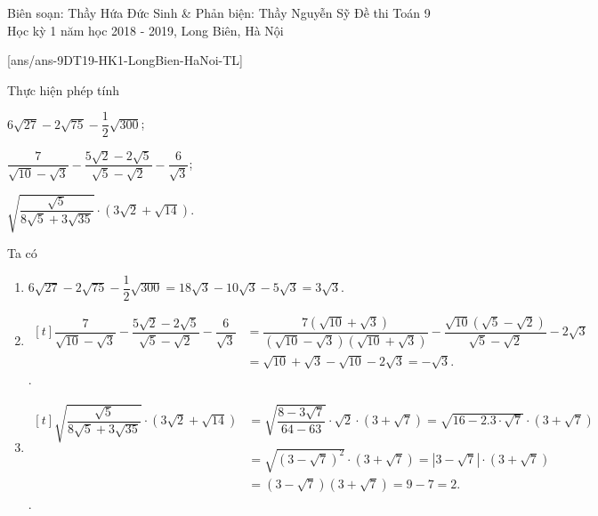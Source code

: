 \begin{name}
{Biên soạn: Thầy Hứa Đức Sinh \& Phản biện: Thầy Nguyễn Sỹ}
{Đề thi Toán 9 Học kỳ 1 năm học 2018 - 2019, Long Biên, Hà Nội}
\end{name}
\setcounter{bt}{0}
[ans/ans-9DT19-HK1-LongBien-HaNoi-TL]
\begin{ex}%
	Thực hiện phép tính
	\begin{listEX}[2]
		\item $6\sqrt{27} - 2\sqrt{75} - \dfrac{1}{2}\sqrt{300}$;
		\item $\dfrac{7}{\sqrt{10} - \sqrt{3}} - \dfrac{5\sqrt{2} - 2\sqrt{5}}{\sqrt{5} - \sqrt{2}} - \dfrac{6}{\sqrt{3}}$;
		\item $\sqrt{\dfrac{\sqrt{5}}{8\sqrt{5} + 3\sqrt{35}}}\cdot(3\sqrt{2} + \sqrt{14})$.
	\end{listEX}
	\loigiai
	{
		Ta có
		\begin{enumerate}
			\item $6\sqrt{27} - 2\sqrt{75} - \dfrac{1}{2}\sqrt{300} = 18\sqrt{3} - 10\sqrt{3} - 5\sqrt{3}= 3\sqrt{3}$.
			\item $\begin{aligned}[t]
				\dfrac{7}{\sqrt{10} - \sqrt{3}} - \dfrac{5\sqrt{2} - 2\sqrt{5}}{\sqrt{5} - \sqrt{2}} - \dfrac{6}{\sqrt{3}} &= \dfrac{7\left(\sqrt{10}+\sqrt{3}\right)}{\left(\sqrt{10} - \sqrt{3}\right)\left(\sqrt{10}+\sqrt{3}\right)} - \dfrac{\sqrt{10}\left(\sqrt{5} - \sqrt{2}\right)}{\sqrt{5}-\sqrt{2}} - 2\sqrt{3} \\
				&= \sqrt{10}+\sqrt{3} - \sqrt{10} - 2\sqrt{3} = -\sqrt{3}.
				\end{aligned}$.
			\item $\begin{aligned}[t]
				\sqrt{\dfrac{\sqrt{5}}{8\sqrt{5} + 3\sqrt{35}}}\cdot(3\sqrt{2} + \sqrt{14}) &= \sqrt{\dfrac{8 - 3\sqrt{7}}{64 - 63}}\cdot\sqrt{2}\cdot(3 + \sqrt{7}) = \sqrt{16 - 2.3\cdot\sqrt{7}}\cdot(3 + \sqrt{7}) \\
				&= \sqrt{(3 - \sqrt{7})^2}\cdot(3 + \sqrt{7}) = | 3 - \sqrt{7}|\cdot(3 + \sqrt{7})\\
			 	&=(3 - \sqrt{7})(3 + \sqrt{7}) = 9 - 7 = 2.
			 	\end{aligned}$.
		\end{enumerate}
	}
\end{ex}

